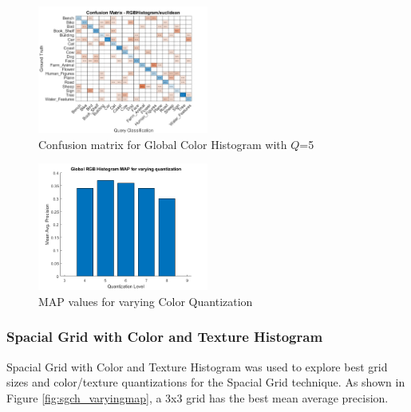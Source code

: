 \begin{figure}[htbp]
  \begin{center}
    \includegraphics[width=0.5\textwidth]{./assets/plots/Global_Color_Histogram/confusion_matrix_n10.jpg}
    \caption{Confusion matrix for Global Color Histogram with $Q$=5}
    \label{fig:gch_confmat}
  \end{center}
\end{figure}

\begin{figure}[htbp]
  \begin{center}
    \includegraphics[width=0.5\textwidth]{./assets/plots/Global_Color_Histogram/map_varying_q.png}
    \caption{MAP values for varying Color Quantization}
    \label{fig:gch_varyingmap}
  \end{center}
\end{figure}


\subsubsection{Spacial Grid with Color and Texture Histogram}
\label{sec:results_spacial_grid}

Spacial Grid with Color and Texture Histogram was used to explore best grid sizes and color/texture quantizations for
the Spacial Grid technique. As shown in Figure \ref{fig:sgch_varyingmap}, a 3x3 grid has the best mean average
precision.


